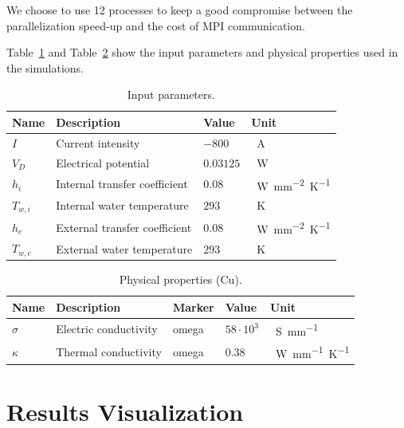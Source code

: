 \documentclass[12pt]{article}
\begin{document}
We choose to use 12 processes to keep a good compromise between the parallelization
speed-up and the cost of MPI communication.

Table~\ref{tab:input_parameters} and Table~\ref{tab:physical_properties} show the
input parameters and physical properties used in the simulations.

\begin{table}[H]
  \centering
  \renewcommand{\arraystretch}{1.5} %
  \begin{tabular}{p{1cm}p{6cm}p{2cm}p{2cm}}
    \toprule
    \textbf{Name} & \textbf{Description} & \textbf{Value} & \textbf{Unit} \\
    \midrule
    $I$ & Current intensity & $-800$ & \SI{}{\ampere} \\
    $V_D$ & Electrical potential & $0.03125$ & \SI{}{\watt} \\
    $h_i$ & Internal transfer coefficient & $0.08$ & \SI{}{\watt mm^{-2} \kelvin^{-1}}  \\
    $T_{w,i}$ & Internal water temperature & $293$ & \SI{}{\kelvin} \\
    $h_e$ & External transfer coefficient & $0.08$ & \SI{}{\watt mm^{-2} \kelvin^{-1}} \\
    $T_{w,e}$ & External water temperature & $293$ & \SI{}{\kelvin} \\
    \bottomrule
  \end{tabular}
  \caption{Input parameters.}
  \label{tab:input_parameters}
\end{table}

\begin{table}[H]
  \centering
  \renewcommand{\arraystretch}{1.5} %
  \begin{tabular}{p{1cm}p{5cm}p{3cm}p{2cm}p{2cm}}
    \toprule
    \textbf{Name} & \textbf{Description} & \textbf{Marker} & \textbf{Value} & \textbf{Unit} \\
    \midrule
    $\sigma$ & Electric conductivity & omega & $58 \cdot 10^3$ & \SI{}{\siemens mm^{-1}} \\
    $\kappa$ & Thermal conductivity & omega & $0.38$ & \SI{}{\watt mm^{-1} \kelvin^{-1}} \\
    \bottomrule
  \end{tabular}
  \caption{Physical properties (Cu).}
  \label{tab:physical_properties}
\end{table}

\section{Results Visualization}
\end{document}

